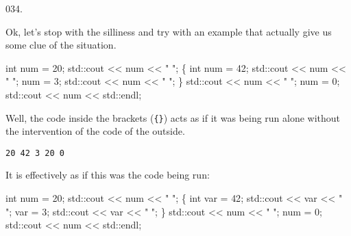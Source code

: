 \documentclass[]{book}
\newenvironment{Shaded}{}{}
\newcommand{\BuiltInTok}[1]{#1}
\newcommand{\DataTypeTok}[1]{\textcolor[rgb]{0.56,0.13,0.00}{#1}}
\newcommand{\DecValTok}[1]{\textcolor[rgb]{0.25,0.63,0.44}{#1}}
\newcommand{\NormalTok}[1]{#1}
\newcommand{\StringTok}[1]{\textcolor[rgb]{0.25,0.44,0.63}{#1}}
\begin{document}
\begin{minipage}{\linewidth}\noindent
{\tiny 034.}\\
\begin{minipage}[t]{.485\linewidth}

Ok, let's stop with the silliness and try with an example that actually
give us some clue of the situation.

\begin{framed}

\begin{Shaded}
\begin{Highlighting}[]
\DataTypeTok{int}\NormalTok{ num = }\DecValTok{20}\NormalTok{;}
\BuiltInTok{std::}\NormalTok{cout << num << }\StringTok{" "}\NormalTok{;}
\NormalTok{\{}
  \DataTypeTok{int}\NormalTok{ num = }\DecValTok{42}\NormalTok{;}
  \BuiltInTok{std::}\NormalTok{cout << num << }\StringTok{" "}\NormalTok{;}
\NormalTok{  num = }\DecValTok{3}\NormalTok{;}
  \BuiltInTok{std::}\NormalTok{cout << num << }\StringTok{" "}\NormalTok{;}
\NormalTok{\}}
\BuiltInTok{std::}\NormalTok{cout << num << }\StringTok{" "}\NormalTok{;}
\NormalTok{num = }\DecValTok{0}\NormalTok{;}
\BuiltInTok{std::}\NormalTok{cout << num << }\BuiltInTok{std::}\NormalTok{endl;}
\end{Highlighting}
\end{Shaded}

\end{framed}

\end{minipage}
\hfill
\begin{minipage}[t]{.485\linewidth}

Well, the code inside the brackets (\texttt{\{\}}) acts as if it was
being run alone without the intervention of the code of the outside.

\begin{framed}

\begin{verbatim}
20 42 3 20 0
\end{verbatim}

\end{framed}

It is effectively as if this was the code being run:

\begin{framed}

\begin{Shaded}
\begin{Highlighting}[]
\DataTypeTok{int}\NormalTok{ num = }\DecValTok{20}\NormalTok{;}
\BuiltInTok{std::}\NormalTok{cout << num << }\StringTok{" "}\NormalTok{;}
\NormalTok{\{}
  \DataTypeTok{int}\NormalTok{ var = }\DecValTok{42}\NormalTok{;}
  \BuiltInTok{std::}\NormalTok{cout << var << }\StringTok{" "}\NormalTok{;}
\NormalTok{  var = }\DecValTok{3}\NormalTok{;}
  \BuiltInTok{std::}\NormalTok{cout << var << }\StringTok{" "}\NormalTok{;}
\NormalTok{\}}
\BuiltInTok{std::}\NormalTok{cout << num << }\StringTok{" "}\NormalTok{;}
\NormalTok{num = }\DecValTok{0}\NormalTok{;}
\BuiltInTok{std::}\NormalTok{cout << num << }\BuiltInTok{std::}\NormalTok{endl;}
\end{Highlighting}
\end{Shaded}


\end{framed}
\end{minipage}
\end{minipage}
\end{document}
